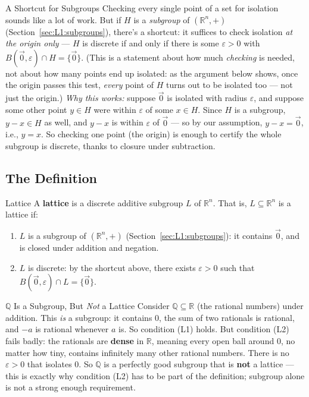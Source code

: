 \begin{rmkbox}{A Shortcut for Subgroups}
Checking every single point of a set for isolation sounds like a lot of work. But if $H$ is a \emph{subgroup} of $(\mathbb{R}^n, +)$ (Section~\ref{sec:L1:subgroups}), there's a shortcut: it suffices to check isolation \emph{at the origin only} --- $H$ is discrete if and only if there is some $\varepsilon>0$ with $B(\vec{0},\varepsilon) \cap H = \{\vec{0}\}$. (This is a statement about how much \emph{checking} is needed, not about how many points end up isolated: as the argument below shows, once the origin passes this test, \emph{every} point of $H$ turns out to be isolated too --- not just the origin.) \emph{Why this works:} suppose $\vec 0$ is isolated with radius $\varepsilon$, and suppose some other point $y \in H$ were within $\varepsilon$ of some $x \in H$. Since $H$ is a subgroup, $y - x \in H$ as well, and $y - x$ is within $\varepsilon$ of $\vec 0$ --- so by our assumption, $y - x = \vec 0$, i.e., $y = x$. So checking one point (the origin) is enough to certify the whole subgroup is discrete, thanks to closure under subtraction.
\end{rmkbox}

\subsection{The Definition}
\label{sec:L1:the-definition}

\begin{defbox}{Lattice}
A \textbf{lattice} is a discrete additive subgroup $L$ of $\mathbb{R}^n$. That is, $L \subseteq \mathbb{R}^n$ is a lattice if:
\begin{enumerate}[leftmargin=*, label=(L\arabic*)]
  \item $L$ is a subgroup of $(\mathbb{R}^n, +)$ (Section~\ref{sec:L1:subgroups}): it contains $\vec 0$, and is closed under addition and negation.
  \item $L$ is discrete: by the shortcut above, there exists $\varepsilon > 0$ such that $B(\vec 0, \varepsilon) \cap L = \{\vec 0\}$.
\end{enumerate}
\end{defbox}

\begin{exbox}{$\mathbb{Q}$ Is a Subgroup, But \emph{Not} a Lattice}
Consider $\mathbb{Q} \subseteq \mathbb{R}$ (the rational numbers) under addition. This \emph{is} a subgroup: it contains $0$, the sum of two rationals is rational, and $-a$ is rational whenever $a$ is. So condition (L1) holds. But condition (L2) fails badly: the rationals are \textbf{dense} in $\mathbb{R}$, meaning every open ball around $0$, no matter how tiny, contains infinitely many other rational numbers. There is no $\varepsilon>0$ that isolates $0$. So $\mathbb{Q}$ is a perfectly good subgroup that is \textbf{not} a lattice --- this is exactly why condition (L2) has to be part of the definition; subgroup alone is not a strong enough requirement.
\end{exbox}

